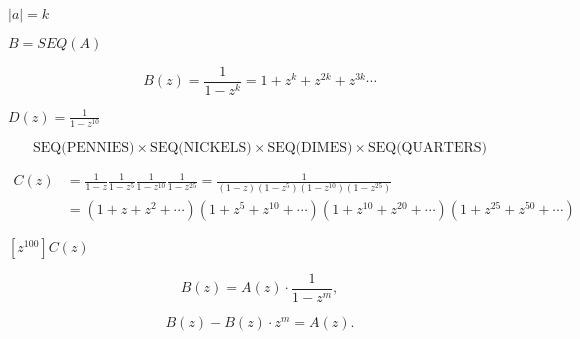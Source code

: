 \documentclass[10pt]{book}
\begin{document}
\begin{mdSnippets}
\begin{mdInlineSnippet}%
$|a|=k$\end{mdInlineSnippet}%
\begin{mdInlineSnippet}[15af214fd464bd95c3425b8abb68159e]%
$B=SEQ(A)$\end{mdInlineSnippet}%
\begin{mdDisplaySnippet}%
\[%
B(z) = \frac{1}{1-z^k}=1+z^k+z^{2k}+z^{3k}\cdots
\]%
\end{mdDisplaySnippet}%
\begin{mdInlineSnippet}%
$D(z)=\frac{1}{1-z^{10}}$\end{mdInlineSnippet}%
\begin{mdDisplaySnippet}[6070848c131a1a303839483aa543cd08]%
\[%
  \text{SEQ(PENNIES)} \times \text{SEQ(NICKELS)} \times \text{SEQ(DIMES)} \times \text{SEQ(QUARTERS)}  
\]%
\end{mdDisplaySnippet}%
\begin{mdDisplaySnippet}[2e6e301c4cec00c0d0a1ae25194b04dd]%
\[%
\begin{aligned} 
C(z)&=\frac{1}{1-z}\frac{1}{1-z^5}\frac{1}{1-z^{10}}\frac{1}{1-z^{25}}
    =\frac{1}{(1-z)(1-z^5)(1-z^{10})(1-z^{25})}\\
    &=(1+z+z^2+\cdots)(1 + z^5 + z^{10} + \cdots)(1 + z^{10}+z^{20}+\cdots)(
      1+z^{25}+z^{50} + \cdots)
\end{aligned}
\]%
\end{mdDisplaySnippet}%
\begin{mdInlineSnippet}[d01a6119f94a8fdc0d5bd229fb83ae2e]%
$[z^{100}]C(z)$\end{mdInlineSnippet}%
\begin{mdDisplaySnippet}%
\[%
  B(z) = A(z)\cdot \dfrac{1}{1-z^m},
\]%
\end{mdDisplaySnippet}%
\begin{mdDisplaySnippet}[a6fb95e866a04275d0946577fb57b4f0]%
\[%
  B(z) - B(z)\cdot z^m = A(z).
\]%
\end{mdDisplaySnippet}%
\begin{mdDisplaySnippet}[7d7737db137d60eac1826bc867b6ca39]%

\end{mdDisplaySnippet}
\end{mdSnippets}
\end{document}
